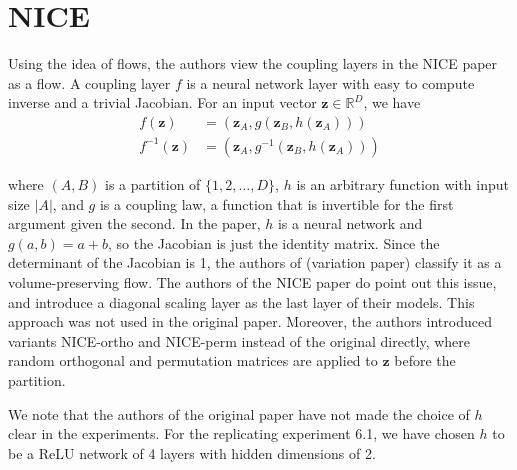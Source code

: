 \section{NICE}

Using the idea of flows, the authors view the coupling layers in the NICE paper as a flow. A coupling layer $f$ is a neural network layer with easy to compute inverse and a trivial Jacobian. For an input vector $\mathbf{z} \in \mathbb{R}^D$, we have
\begin{align*}
    f(\mathbf{z}) &= (\mathbf{z}_A, g(\mathbf{z}_B,h(\mathbf{z}_A)))\\
    f^{-1}(\mathbf{z}) &= (\mathbf{z}_A, g^{-1}(\mathbf{z}_B,h(\mathbf{z}_A)))
\end{align*}

where $(A,B)$ is a partition of $\{1,2,\dots,D\}$, $h$ is an arbitrary function with input size $|A|$, and $g$ is a coupling law, a function that is invertible for the first argument given the second. In the paper, $h$ is a neural network and $g(a,b)=a+b$, so the Jacobian is just the identity matrix. Since the determinant of the Jacobian is 1, the authors of (variation paper) classify it as a volume-preserving flow.
The authors of the NICE paper do point out this issue, and introduce a diagonal scaling layer as the last layer of their models. This approach was not used in the original paper. Moreover, the authors introduced variants NICE-ortho and NICE-perm instead of the original directly, where random orthogonal and permutation matrices are applied to $\mathbf{z}$ before the partition. 

We note that the authors of the original paper have not made the choice of $h$ clear in the experiments. For the replicating experiment 6.1, we have chosen $h$ to be a ReLU network of 4 layers with hidden dimensions of 2.